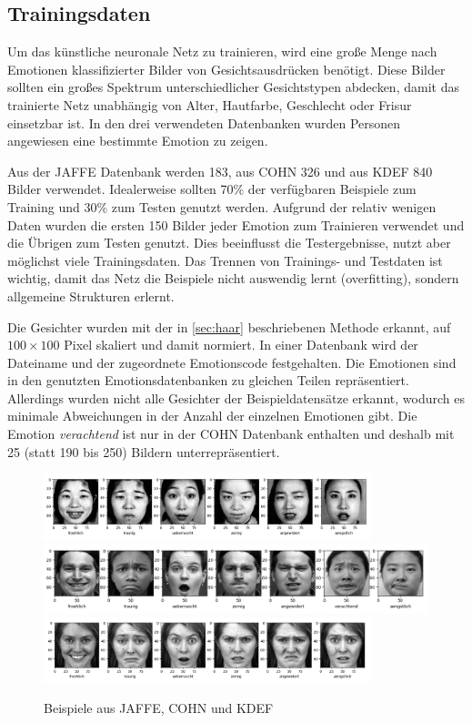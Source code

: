 \documentclass[12pt, a4paper]{article}
\begin{document}
\subsection{Trainingsdaten}
Um das künstliche neuronale Netz zu trainieren, wird eine große Menge nach Emotionen klassifizierter Bilder von Gesichtsausdrücken benötigt. Diese Bilder sollten ein großes Spektrum unterschiedlicher Gesichtstypen abdecken,  damit das trainierte Netz unabhängig von  Alter, Hautfarbe, Geschlecht oder Frisur einsetzbar ist. In den drei verwendeten Datenbanken wurden Personen angewiesen eine bestimmte Emotion zu zeigen.

Aus der JAFFE Datenbank werden 183, aus COHN 326 und aus KDEF 840 Bilder verwendet. Idealerweise sollten 70\% der verfügbaren Beispiele zum Training und 30\% zum Testen genutzt werden. Aufgrund der relativ wenigen Daten wurden die ersten 150 Bilder jeder Emotion zum Trainieren verwendet und die Übrigen zum Testen genutzt. Dies beeinflusst die Testergebnisse, nutzt aber möglichst viele Trainingsdaten. Das Trennen von Trainings- und Testdaten ist wichtig, damit das Netz die Beispiele nicht auswendig lernt (overfitting), sondern allgemeine Strukturen erlernt.

Die Gesichter wurden mit der in \ref{sec:haar} beschriebenen Methode erkannt, auf \(100 \times 100\) Pixel skaliert und damit normiert. In einer Datenbank wird der Dateiname und der zugeordnete Emotionscode festgehalten. Die Emotionen sind in den genutzten Emotionsdatenbanken zu gleichen Teilen repräsentiert.  Allerdings wurden nicht alle Gesichter der Beispieldatensätze erkannt, wodurch es minimale Abweichungen in der Anzahl der einzelnen Emotionen gibt. Die Emotion \textit{verachtend} ist nur in der COHN Datenbank enthalten und deshalb mit 25 (statt 190 bis 250) Bildern unterrepräsentiert.

\begin{figure}[h]
	\centering
	\includegraphics[width=0.85\textwidth]{jaffe_emotions}
	\includegraphics[width=1.0\textwidth]{cohn_emotions}
	\includegraphics[width=0.85\textwidth]{kdef_emotions}
	\caption{Beispiele aus JAFFE\cite{db:jaffe}, COHN\cite{db:cohn1} und KDEF\cite{db:kdef}}
\end{figure}
\end{document}
